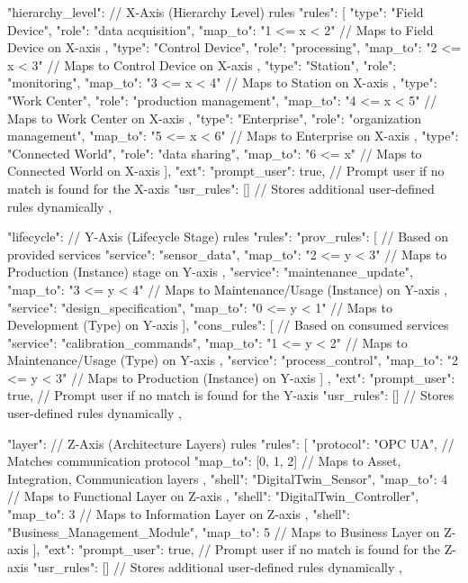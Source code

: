 {
  "hierarchy_level": {  // X-Axis (Hierarchy Level) rules
    "rules": [
      {
        "type": "Field Device",
        "role": "data acquisition",
        "map_to": "1 <= x < 2"  // Maps to Field Device on X-axis
      },
      {
        "type": "Control Device", 
        "role": "processing",  
        "map_to": "2 <= x < 3"  // Maps to Control Device on X-axis
      },
      {
        "type": "Station",  
        "role": "monitoring",  
        "map_to": "3 <= x < 4"  // Maps to Station on X-axis
      },
      {
        "type": "Work Center",  
        "role": "production management",  
        "map_to": "4 <= x < 5"  // Maps to Work Center on X-axis
      },
      {
        "type": "Enterprise",  
        "role": "organization management",  
        "map_to": "5 <= x < 6"  // Maps to Enterprise on X-axis
      },
      {
        "type": "Connected World",  
        "role": "data sharing",  
        "map_to": "6 <= x"  // Maps to Connected World on X-axis
      }
    ],
    "ext": {
      "prompt_user": true,  // Prompt user if no match is found for the X-axis
      "usr_rules": []  // Stores additional user-defined rules dynamically
    }
  },

  "lifecycle": {  // Y-Axis (Lifecycle Stage) rules
    "rules": {
      "prov_rules": [  // Based on provided services
        {
          "service": "sensor_data",  
          "map_to": "2 <= y < 3"  // Maps to Production (Instance) stage on Y-axis
        },
        {
          "service": "maintenance_update",  
          "map_to": "3 <= y < 4"  // Maps to Maintenance/Usage (Instance) on Y-axis
        },
        {
          "service": "design_specification",  
          "map_to": "0 <= y < 1"  // Maps to Development (Type) on Y-axis
        }
      ],
      "cons_rules": [  // Based on consumed services
        {
          "service": "calibration_commands",  
          "map_to": "1 <= y < 2"  // Maps to Maintenance/Usage (Type) on Y-axis
        },
        {
          "service": "process_control",  
          "map_to": "2 <= y < 3"  // Maps to Production (Instance) on Y-axis
        }
      ]
    },
    "ext": {
      "prompt_user": true,  // Prompt user if no match is found for the Y-axis
      "usr_rules": []  // Stores user-defined rules dynamically
    }
  },

  "layer": {  // Z-Axis (Architecture Layers) rules
    "rules": [
      {
        "protocol": "OPC UA",  // Matches communication protocol
        "map_to": [0, 1, 2]  // Maps to Asset, Integration, Communication layers
      },
      {
        "shell": "DigitalTwin_Sensor",  
        "map_to": 4  // Maps to Functional Layer on Z-axis
      },
      {
        "shell": "DigitalTwin_Controller",  
        "map_to": 3  // Maps to Information Layer on Z-axis
      },
      {
        "shell": "Business_Management_Module",  
        "map_to": 5  // Maps to Business Layer on Z-axis
      }
    ],
    "ext": {
      "prompt_user": true,  // Prompt user if no match is found for the Z-axis
      "usr_rules": []  // Stores additional user-defined rules dynamically
    }
  },

}
